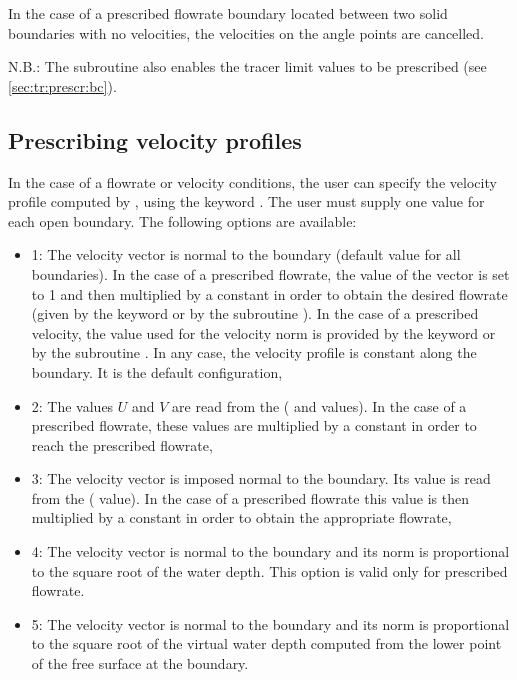 In the case of a prescribed flowrate boundary located between two solid
boundaries with no velocities, the velocities on the angle points are cancelled.

N.B.: The  subroutine also enables the tracer limit values
to be prescribed (see \ref{sec:tr:prescr:bc}).


\subsection{Prescribing velocity profiles}
\label{subs:presc:vel:prof}
In the case of a flowrate or velocity conditions, the user can specify the
velocity profile computed by , using the keyword
.
The user must supply one value for each open boundary.
The following options are available:

\begin{itemize}
\item 1: The velocity vector is normal to the boundary
(default value for all boundaries).
In the case of a prescribed flowrate, the value of the vector is set to 1
and then multiplied by a constant in order to obtain the desired flowrate
(given by the keyword  or by the subroutine
).
In the case of a prescribed velocity, the value used for the velocity norm
is provided by the keyword 
or by the subroutine .
In any case, the velocity profile is constant along the boundary.
It is the default configuration,

\item 2: The values $U$ and $V$ are read from the
( and  values).
In the case of a prescribed flowrate, these values are multiplied by a constant
in order to reach the prescribed flowrate,

\item 3: The velocity vector is imposed normal to the boundary.
Its value is read from the  (
value).
In the case of a prescribed flowrate this value is then multiplied by a constant
in order to obtain the appropriate flowrate,

\item 4: The velocity vector is normal to the boundary and its norm
is proportional to the square root of the water depth.
This option is valid only for prescribed flowrate.

\item 5: The velocity vector is normal to the boundary and its norm
is proportional to the square root of the virtual water depth computed
from the lower point of the free surface at the boundary.
\end{itemize}

